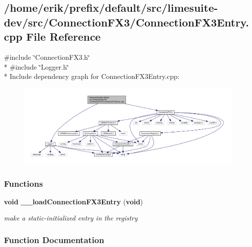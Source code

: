 \subsection{/home/erik/prefix/default/src/limesuite-\/dev/src/\+Connection\+F\+X3/\+Connection\+F\+X3\+Entry.cpp File Reference}
\label{ConnectionFX3Entry_8cpp}
{\ttfamily \#include \char`\"{}Connection\+F\+X3.\+h\char`\"{}}\\*
{\ttfamily \#include \char`\"{}Logger.\+h\char`\"{}}\\*
Include dependency graph for Connection\+F\+X3\+Entry.\+cpp\+:
\nopagebreak
\begin{figure}[H]
\begin{center}
\leavevmode
\includegraphics[width=350pt]{d0/d6e/ConnectionFX3Entry_8cpp__incl}
\end{center}
\end{figure}
\subsubsection*{Functions}
\begin{DoxyCompactItemize}
\item 
{\bf void} {\bf \+\_\+\+\_\+load\+Connection\+F\+X3\+Entry} ({\bf void})
\begin{DoxyCompactList}\small\item\em make a static-\/initialized entry in the registry \end{DoxyCompactList}\end{DoxyCompactItemize}


\subsubsection{Function Documentation}
